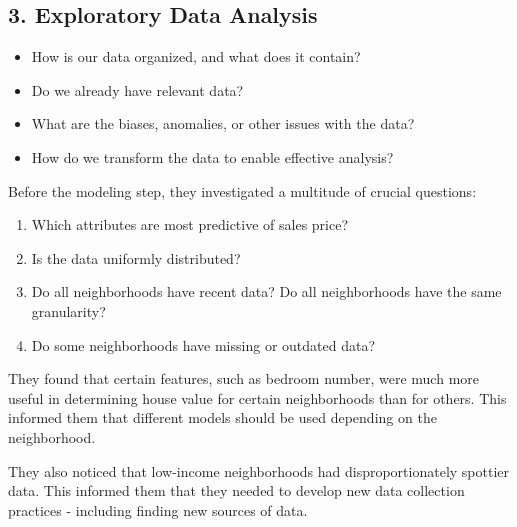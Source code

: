 \documentclass[
  letterpaper,
  DIV=11,
  numbers=noendperiod]{scrreprt}
\providecommand{\tightlist}{%
  \setlength{\itemsep}{0pt}\setlength{\parskip}{0pt}}\usepackage{longtable,booktabs,array}
\begin{document}
\subsection{3. Exploratory Data
Analysis}\label{exploratory-data-analysis}

\begin{tcolorbox}[enhanced jigsaw, arc=.35mm, colbacktitle=quarto-callout-note-color!10!white, coltitle=black, bottomrule=.15mm, leftrule=.75mm, bottomtitle=1mm, colback=white, toptitle=1mm, breakable, titlerule=0mm, rightrule=.15mm, colframe=quarto-callout-note-color-frame, opacitybacktitle=0.6, left=2mm, title=\textcolor{quarto-callout-note-color}{\faInfo}\hspace{0.5em}{Driving Questions}, toprule=.15mm, opacityback=0]

\begin{itemize}
\tightlist
\item
  How is our data organized, and what does it contain?
\item
  Do we already have relevant data?
\item
  What are the biases, anomalies, or other issues with the data?
\item
  How do we transform the data to enable effective analysis?
\end{itemize}

\end{tcolorbox}

Before the modeling step, they investigated a multitude of crucial
questions:

\begin{enumerate}
\def\labelenumi{\arabic{enumi}.}
\tightlist
\item
  Which attributes are most predictive of sales price?
\item
  Is the data uniformly distributed?
\item
  Do all neighborhoods have recent data? Do all neighborhoods have the
  same granularity?\\
\item
  Do some neighborhoods have missing or outdated data?
\end{enumerate}

They found that certain features, such as bedroom number, were much more
useful in determining house value for certain neighborhoods than for
others. This informed them that different models should be used
depending on the neighborhood.

They also noticed that low-income neighborhoods had disproportionately
spottier data. This informed them that they needed to develop new data
collection practices - including finding new sources of data.
\end{document}
